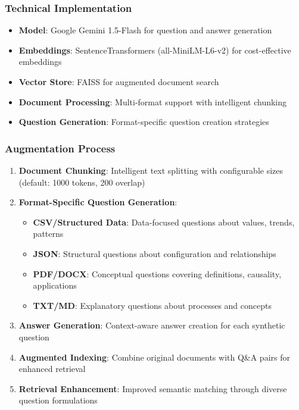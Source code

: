 \documentclass[12pt,a4paper]{article}
\begin{document}
\subsubsection{Technical Implementation}
\begin{itemize}
    \item \textbf{Model}: Google Gemini 1.5-Flash for question and answer generation
    \item \textbf{Embeddings}: SentenceTransformers (all-MiniLM-L6-v2) for cost-effective embeddings
    \item \textbf{Vector Store}: FAISS for augmented document search
    \item \textbf{Document Processing}: Multi-format support with intelligent chunking
    \item \textbf{Question Generation}: Format-specific question creation strategies
\end{itemize}

\subsubsection{Augmentation Process}
\begin{enumerate}
    \item \textbf{Document Chunking}: Intelligent text splitting with configurable sizes (default: 1000 tokens, 200 overlap)
    \item \textbf{Format-Specific Question Generation}:
    \begin{itemize}
        \item \textbf{CSV/Structured Data}: Data-focused questions about values, trends, patterns
        \item \textbf{JSON}: Structural questions about configuration and relationships
        \item \textbf{PDF/DOCX}: Conceptual questions covering definitions, causality, applications
        \item \textbf{TXT/MD}: Explanatory questions about processes and concepts
    \end{itemize}
    \item \textbf{Answer Generation}: Context-aware answer creation for each synthetic question
    \item \textbf{Augmented Indexing}: Combine original documents with Q\&A pairs for enhanced retrieval
    \item \textbf{Retrieval Enhancement}: Improved semantic matching through diverse question formulations
\end{enumerate}
\end{document}
